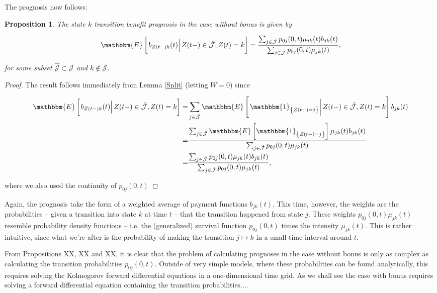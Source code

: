 \documentclass{article}
\newcommand{\1}[1]{\mathbbm{1}_{\left\lbrace #1 \right\rbrace}}
\newcommand{\expec}[1][def]{\mathbbm{E} \left[ #1 \right]}
\newcommand{\econd}[2][def]{\mathbbm{E} \left[ \left. #1 \right| #2 \right]}
\theoremstyle{break}
\newtheorem{proposition}[definition]{Proposition}%
\theoremstyle{remark}
\newenvironment{remark}
  {\pushQED{\qed}\renewcommand{\qedsymbol}{\scalebox{1.4}{$\circ$}}\remarkx}
  {\popQED\endremarkx}
\numberwithin{equation}{section}
\begin{document}
The prognosis now follows:

\begin{proposition} \label{TransitionWithoutBonus}
The state $k$ transition benefit prognosis in the case without bonus is given by

\begin{align*}
    \econd[b_{Z(t-)k}(t)]{Z(t-) \in \hat{\mathcal{J}}, Z(t)=k} = \frac{\sum_{j \in \hat{\mathcal{J}}} p_{0j}(0,t) \mu_{jk}(t) b_{jk}(t)}{\sum_{j \in \hat{\mathcal{J}}} p_{0j}(0,t) \mu_{jk}(t)},
\end{align*}

for some subset $\hat{\mathcal{J}} \subset \mathcal{J}$ and $k \notin \bar{\mathcal{J}}$.
\end{proposition}
\begin{proof}
The result follows immediately from Lemma \ref{Split} (letting $W=0$) since

\begin{align*}
	\econd[b_{Z(t-)k}(t)]{Z(t-) \in \hat{\mathcal{J}}, Z(t)=k} =& \sum_{j \in \hat{\mathcal{J}}} \econd[\1{Z(t-)=j}]{Z(t-) \in \hat{\mathcal{J}}, Z(t) = k} b_{jk}(t) \\
	=&\frac{\sum_{j \in \hat{\mathcal{J}}} \expec[\1{Z(t-)=j}] \mu_{jk}(t) b_{jk}(t)}{\sum_{j \in \hat{\mathcal{J}}} p_{0j}(0,t) \mu_{jk}(t)} \\
	=&\frac{\sum_{j \in \hat{\mathcal{J}}} p_{0j}(0,t) \mu_{jk}(t) b_{jk}(t)}{\sum_{j \in \hat{\mathcal{J}}} p_{0j}(0,t) \mu_{jk}(t)},
\end{align*}

where we also used the continuity of $p_{0j}(0,t)$
\end{proof}

Again, the prognosis take the form of a weighted average of payment functions $b_{jk}(t)$. This time, however, the weights are the probabilities -- given a transition into state $k$ at time $t$ -- that the transition happened from state $j$. These weights $p_{0j}(0,t) \mu_{jk}(t)$ resemble probability density functions -- i.e. the (generalized) survival function $p_{0j}(0,t)$ times the intensity $\mu_{jk}(t)$. This is rather intuitive, since what we're after is the probability of making the transition $j \mapsto k$ in a small time interval around $t$.

\begin{remark}
	From Propositions XX, XX and XX, it is clear that the problem of calculating prognoses in the case without bonus is only as complex as calculating the transition probabilities $p_{0j}(0,t)$. Outside of very simple models, where these probabilities can be found analytically, this requires solving the Kolmogorov forward differential equations in a one-dimensional time grid. As we shall see the case with bonus requires solving a forward differential equation containing the transition probabilities....
\end{remark}
\end{document}
